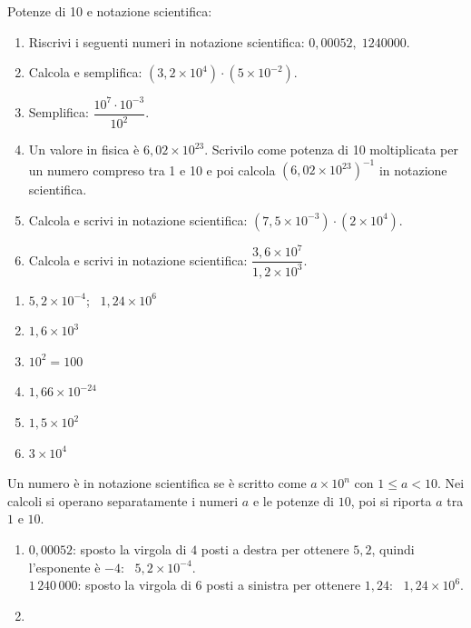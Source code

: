 \begin{question}[ID=1.4, subtitle={Potenze di 10 e notazione scientifica}, tags={potenze, notazione scientifica}, difficulty=facile]
Potenze di 10 e notazione scientifica:
\begin{enumerate}[leftmargin=3.2cm]
    \item Riscrivi i seguenti numeri in notazione scientifica: $0{,}00052,\;1240000$.
    \item Calcola e semplifica: $(3{,}2\times 10^{4})\cdot (5\times 10^{-2})$.
    \item Semplifica: $\dfrac{10^{7}\cdot 10^{-3}}{10^{2}}$.
    \item Un valore in fisica è $6{,}02\times 10^{23}$. Scrivilo come potenza di 10 moltiplicata per un numero compreso tra 1 e 10 e poi calcola $(6{,}02\times 10^{23})^{-1}$ in notazione scientifica.
    \item Calcola e scrivi in notazione scientifica: $(7{,}5\times10^{-3})\cdot(2\times10^4)$.
    \item Calcola e scrivi in notazione scientifica: $\dfrac{3{,}6\times10^7}{1{,}2\times10^3}$.
\end{enumerate}
\begin{solution}
\begin{enumerate}
    \item $5{,}2\times10^{-4}$; \ $1{,}24\times10^6$
    \item $1{,}6\times10^3$
    \item $10^2=100$
    \item $1{,}66\times10^{-24}$
    \item $1{,}5\times10^2$
    \item $3\times10^4$
\end{enumerate}
\end{solution}
\begin{explanation}
Un numero è in notazione scientifica se è scritto come $a\times10^n$ con $1\leq a<10$. Nei calcoli si operano separatamente i numeri $a$ e le potenze di $10$, poi si riporta $a$ tra $1$ e $10$.
\begin{enumerate}
    \item $0{,}00052$: sposto la virgola di $4$ posti a destra per ottenere $5{,}2$, quindi l'esponente è $-4$: \ $5{,}2\times10^{-4}$. \\
    $1\,240\,000$: sposto la virgola di $6$ posti a sinistra per ottenere $1{,}24$: \ $1{,}24\times10^{6}$.
    \item \[\begin{aligned}

\end{aligned}\]
\end{enumerate}
\end{explanation}
\end{question}
